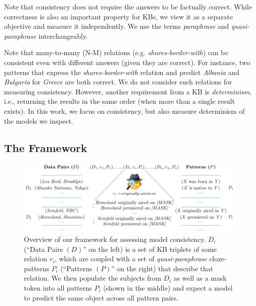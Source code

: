 Note that consistency does not require the answers to be factually correct. While correctness is also an important property for KBs, we view it as a separate objective and measure it independently.
We use the terms \textit{paraphrase} and \textit{quasi-paraphrase} interchangeably.
 


Note that many-to-many (N-M) relations (e.g. \textit{shares-border-with}) can be consistent 
even with different answers (given they are correct). For
instance, two patterns that express the
\textit{shares-border-with} relation and predict
\textit{Albania} and \textit{Bulgaria} for
\textit{Greece}
are both correct. We do not consider such relations for measuring consistency. However, another requirement from a KB is \textit{determinism}, i.e., returning the results in the same order (when more than a single result exists).
In this work, we focus on consistency, but also measure determinism of the models we inspect.

\subsection{The Framework}
\label{sec:framework}

\begin{figure}[t!]
\centering

\includegraphics[width=1.\columnwidth]{figures/framework}

\caption{Overview of our framework for assessing model
  consistency. $D_i$ (``Data Pairs $(D)$'' on the left) is a
  set of KB triplets of some relation $r_i$, which are
  coupled with a set of \textit{quasi-paraphrase}
  cloze-patterns $P_i$
(``Patterns $(P)$'' on the right)
  that describe that relation. We then populate the subjects
  from $D_i$ as well as a mask token into all patterns $P_i$
(shown in the middle)
  and expect a model to predict the same object across all pattern pairs.}
\label{fig:framework}
\end{figure}


